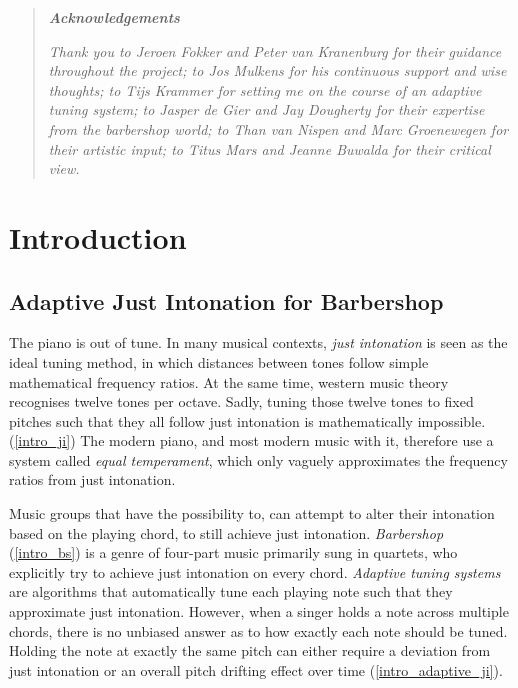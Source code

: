 \documentclass[a4paper]{article}
\begin{document}
\begin{titlepage}
\begin{quotation}
	\begin{center}
		\textbf{\textit{Acknowledgements}}
	\end{center}
	{\small \it Thank you to Jeroen Fokker and Peter van Kranenburg for their guidance throughout the project; to Jos Mulkens for his continuous support and wise thoughts; to Tijs Krammer for setting me on the course of an adaptive tuning system; to Jasper de Gier and Jay Dougherty for their expertise from the barbershop world; to Than van Nispen and Marc Groenewegen for their artistic input; to Titus Mars and Jeanne Buwalda for their critical view.}
\end{quotation}

\end{titlepage}

\newgeometry{} %

\section{Introduction}
\subsection{Adaptive Just Intonation for Barbershop}
The piano is out of tune. In many musical contexts, \textit{just intonation} is seen as the ideal tuning method, in which distances between tones follow simple mathematical frequency ratios. \cite{boyden_prelleur_1951, fonville_ben_1991} At the same time, western music theory recognises twelve tones per octave. \cite{persichetti_twentieth-century_1961} Sadly, tuning those twelve tones to fixed pitches such that they all follow just intonation is mathematically impossible. (\ref{intro_ji}) The modern piano, and most modern music with it, therefore use a system called \textit{equal temperament}, which only vaguely approximates the frequency ratios from just intonation. \cite{van_de_craats_fis_1989}

Music groups that have the possibility to, can attempt to alter their intonation based on the playing chord, to still achieve just intonation. \textit{Barbershop} (\ref{intro_bs}) is a genre of four-part music primarily sung in quartets, who explicitly try to achieve just intonation on every chord. \cite{barbershop_harmony_society_contest_2022, averill_bell_1999} \textit{Adaptive tuning systems} are algorithms that automatically tune each playing note such that they approximate just intonation. \cite{sethares_adaptive_1994} However, when a singer holds a note across multiple chords, there is no unbiased answer as to how exactly each note should be tuned. Holding the note at exactly the same pitch can either require a deviation from just intonation or an overall pitch drifting effect over time (\ref{intro_adaptive_ji}).
\end{document}
